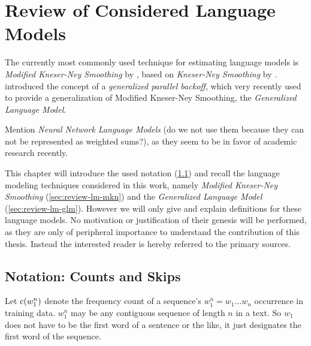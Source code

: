 \chapter{Review of Considered Language Models}
\label{ch:review}

The currently most commonly used \parencite{JurafskyMartin2009,Chelba2013}
technique for estimating language models is \emph{Modified Kneser-Ney Smoothing}
by \textcite{ChenGoodman1996,ChenGoodman1998,ChenGoodman1999}, based on
\emph{Kneser-Ney Smoothing} by \textcite{KneserNey1995}.
\textcite{BilmesKirchhoff2003} introduced the concept of a \emph{generalized
parallel backoff}, which very recently \textcite{Pickhardt2014} used to provide
a generalization of Modified Kneser-Ney Smoothing, the \emph{Generalized
Language Model}.

\begin{draft}
Mention \emph{Neural Network Language Models} \parencite{Bengio2003,Mikolov2012}
(do we not use them because they can not be represented as weighted sums?), as
they seem to be in favor of academic research recently.
\end{draft}

This chapter will introduce the used notation (\cref{sec:review-notation})
and recall the language modeling techniques considered in this work,
namely \emph{Modified Kneser-Ney Smoothing} (\cref{sec:review-lm-mkn}) and the
\emph{Generalized Language Model} (\cref{sec:review-lm-glm}).
However we will only give and explain definitions for these language models.
No motivation or justification of their genesis will be performed, as they are
only of peripheral importance to understand the contribution of this thesis.
Instead the interested reader is hereby referred to the primary sources.


\section{Notation: Counts and Skips}
\label{sec:review-notation}

Let $\operatorname{c}(w_1^n)$ denote the frequency count of a sequence's
$w_1^n = w_1 \ldots w_n$ occurrence in training data.
$w_1^n$ may be any contiguous sequence of length $n$ in a text.
So $w_1$ does not have to be the first word of a sentence or the like,
it just designates the first word of the sequence.

